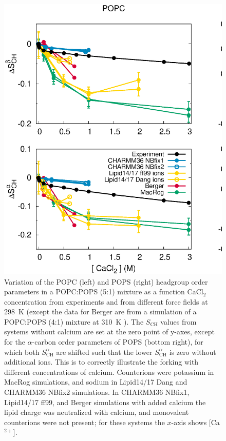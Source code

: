 \documentclass[journal=jpcbfk,manuscript=article]{achemso}
\begin{document}
\begin{figure}[tbp]
  \centering
  \includegraphics[width=\textwidth]{../Figs/CHANGESwithCaClPS.eps}
  \caption{\label{changesWITHCaClPS}
   Variation of the POPC (left) and POPS (right) headgroup order parameters in a POPC:POPS (5:1) mixture
    as a function CaCl$_2$ concentration from experiments \cite{roux90} and from different force fields
    at 298~K (except the data for Berger are from a simulation of a POPC:POPS (4:1) mixture at 310~K \cite{ollila07a,melcrova16}). 
    The $S_\mathrm{CH}$ values from systems without calcium are set at the zero point of y-axes,
    except for the $\alpha$-carbon order parameters of POPS (bottom right), for which both $S^\alpha_\mathrm{CH}$ are shifted
    such that the lower $S^\alpha_\mathrm{CH}$ is zero without additional ions. This is to correctly illustrate
    the forking with different concentrations of calcium.
    Counterions were potassium in MacRog simulations, and sodium in Lipid14/17 Dang and CHARMM36 NBfix2 simulations.
    In CHARMM36 NBfix1, Lipid14/17 ff99, and Berger simulations with added calcium the lipid charge was neutralized with calcium, and monovalent counterions were not present;
    for these systems the $x$-axis shows [Ca$^{2+}$].
  }
\end{figure}
\end{document}
